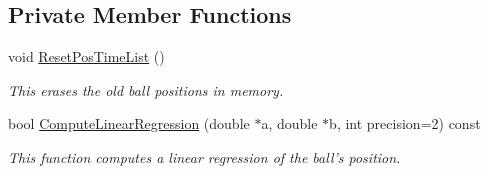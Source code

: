 \subsection*{Private Member Functions}
\begin{DoxyCompactItemize}
\item 
void \hyperlink{classBallMonitor_a09ed61cf1852d45f03e7aacdebfe0175}{ResetPosTimeList} ()
\begin{DoxyCompactList}\small\item\em This erases the old ball positions in memory. \item\end{DoxyCompactList}\item 
bool \hyperlink{classBallMonitor_a49645db55ca752adbc2a5a074c7314be}{ComputeLinearRegression} (double $\ast$a, double $\ast$b, int precision=2) const 
\begin{DoxyCompactList}\small\item\em This function computes a linear regression of the ball's position. \item\end{DoxyCompactList}\end{DoxyCompactItemize}
